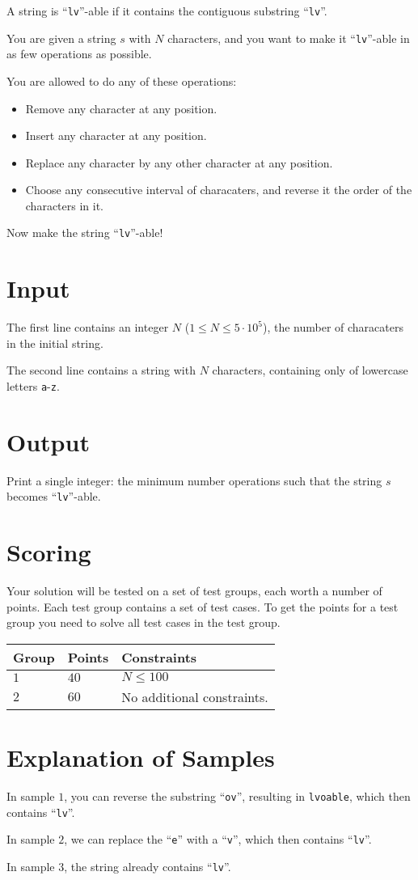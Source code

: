 \noindent
A string is ``\texttt{lv}''-able if it contains the contiguous substring ``\texttt{lv}''.

You are given a string $s$ with $N$ characters, and you want to make it ``\texttt{lv}''-able in as few operations as possible.

You are allowed to do any of these operations:
\begin{itemize}
  \item Remove any character at any position.
  \item Insert any character at any position.
  \item Replace any character by any other character at any position.
  \item Choose any consecutive interval of characaters, and reverse it the order of the characters in it.
\end{itemize}

Now make the string ``\texttt{lv}''-able!

\section*{Input}
The first line contains an integer $N$ ($1 \leq N \leq 5 \cdot 10^5$), the number of characaters in the initial string.

The second line contains a string with $N$ characters, containing only of lowercase letters \texttt{a}-\texttt{z}.

\section*{Output}
Print a single integer: the minimum number operations such that the string $s$ becomes ``\texttt{lv}''-able.

\section*{Scoring}
Your solution will be tested on a set of test groups, each worth a number of points. Each test group contains
a set of test cases. To get the points for a test group you need to solve all test cases in the test group.

\noindent
\begin{tabular}{| l | l | p{12cm} |}
  \hline
  \textbf{Group} & \textbf{Points} & \textbf{Constraints} \\ \hline
  $1$    & $40$       & $N \leq 100$ \\ \hline
  $2$    & $60$       & No additional constraints. \\ \hline
\end{tabular}

\section*{Explanation of Samples}
In sample $1$, you can reverse the substring ``\texttt{ov}'', resulting in \texttt{lvoable}, which then contains
``\texttt{lv}''.

In sample $2$, we can replace the ``\texttt{e}'' with a ``\texttt{v}'', which then contains ``\texttt{lv}''.

In sample $3$, the string already contains ``\texttt{lv}''.
